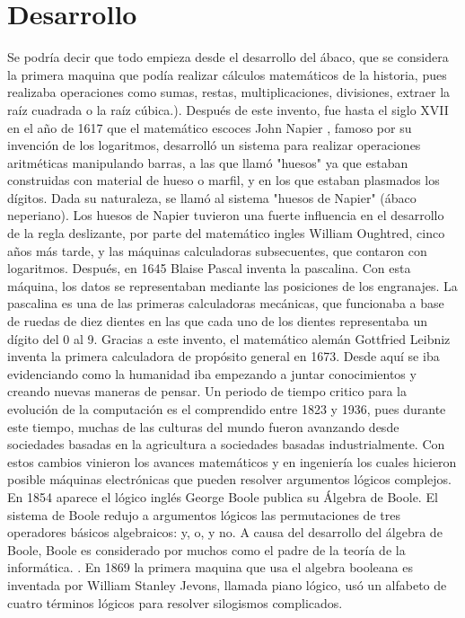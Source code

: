 \documentclass{article}
\begin{document}
\section{Desarrollo}
Se podría decir que todo empieza desde el desarrollo del ábaco, que se considera la primera maquina que podía realizar cálculos matemáticos de la historia, pues realizaba operaciones como sumas, restas, multiplicaciones, divisiones, extraer la raíz cuadrada o la raíz cúbica.\citep{abaco}).
Después de este invento, fue hasta el siglo XVII en el año de 1617 que el matemático escoces John Napier \citep{neper}, famoso por su invención de los logaritmos, desarrolló un sistema para realizar operaciones aritméticas manipulando barras, a las que llamó "huesos" ya que estaban construidas con material de hueso o marfil, y en los que estaban plasmados los dígitos. Dada su naturaleza, se llamó al sistema "huesos de Napier" (ábaco neperiano). Los huesos de Napier tuvieron una fuerte influencia en el desarrollo de la regla deslizante, por parte del matemático ingles William Oughtred, cinco años más tarde, y las máquinas calculadoras subsecuentes, que contaron con logaritmos.
Después, en 1645  Blaise Pascal inventa la pascalina. Con esta máquina, los datos se representaban mediante las posiciones de los engranajes. La pascalina es una de las primeras calculadoras mecánicas, que funcionaba a base de ruedas de diez dientes en las que cada uno de los dientes representaba un dígito del 0 al 9. \citep{pascalina}
Gracias a este invento, el  matemático alemán Gottfried Leibniz inventa la primera calculadora de propósito general en 1673.
Desde aquí se iba evidenciando como la humanidad iba empezando a juntar conocimientos y creando nuevas maneras de pensar. Un periodo de tiempo critico para la evolución de la computación es el comprendido entre 1823 y 1936, pues durante este tiempo, muchas de las culturas del mundo fueron avanzando desde sociedades basadas en la agricultura a sociedades basadas industrialmente. Con estos cambios vinieron los avances matemáticos y en ingeniería los cuales hicieron posible máquinas electrónicas que pueden resolver argumentos lógicos complejos. 
En 1854 aparece el lógico inglés George Boole publica su Álgebra de Boole. El sistema de Boole redujo a argumentos lógicos las permutaciones de tres operadores básicos algebraicos: y, o, y no. A causa del desarrollo del álgebra de Boole, Boole es considerado por muchos como el padre de la teoría de la informática. \citep{boole}. En 1869 la primera maquina que usa el algebra booleana es inventada por William Stanley Jevons, llamada piano lógico, usó un alfabeto de cuatro términos lógicos para resolver silogismos complicados.
\end{document}
